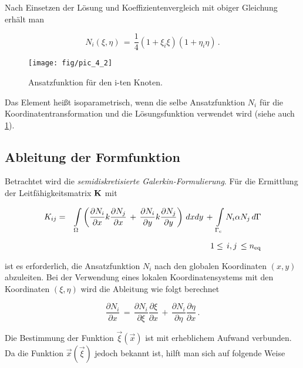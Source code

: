 Nach Einsetzen der Lösung und Koeffizientenvergleich mit obiger Gleichung
erhält man

\begin{equation}
N_i(\xi,\eta)\,=\,\frac{1}{4}\left(1+\xi_i\xi\right)\left(1+\eta_i\eta\right)\,.
\end{equation}

\begin{figure}[htb]
\begin{center}
\texttt{[image: fig/pic\_4\_2]}
\caption{Ansatzfunktion für den i-ten Knoten.}
\label{fig:Ansatzfunktion}
\end{center}
\end{figure}

Das Element heißt isoparametrisch, wenn die selbe Ansatzfunktion $N_i$ für die
Koordinatentransformation und die Lösungsfunktion verwendet wird
(siehe auch \ref{fig:Ansatzfunktion}).

\subsection{Ableitung der Formfunktion}

Betrachtet wird die {\em semidiskretisierte Galerkin-Formulierung}.
Für die Ermittlung der Leitfähigkeitsmatrix $\bf K$ mit

\begin{eqnarray}
K_{ij} &=& \int\limits_\Omega \left(\frac{\partial N_i}{\partial x}k\frac{\partial
N_j}{\partial x}\,+\,\frac{\partial     N_i}{\partial y}k\frac{\partial
N_j}{\partial y}\right)\,dxdy\,+\,\int\limits_{\Gamma_{\rm c}}N_i\alpha N_j\,d\Gamma
\nonumber \\[2mm]
&&1 \le \,i,j\, \le n_{\rm eq}
\end{eqnarray}

ist es erforderlich, die Ansatzfunktion $N_i$ nach den globalen Koordinaten
$(x,y)$ abzuleiten.  Bei der Verwendung eines lokalen Koordinatensystems mit
den Koordinaten $(\xi,\eta)$ wird die Ableitung
wie folgt berechnet

\begin{equation}
\frac{\partial N_i}{\partial x}\,=\,\frac{\partial N_i}{\partial \xi}
\frac{\partial \xi}{\partial x}\,+\,\frac{\partial N_i}{\partial \eta}
\frac{\partial \eta}{\partial x}\,.
\end{equation}

Die Bestimmung der Funktion     $ \vec{\xi}(\vec{x}) $ ist mit
erheblichem Aufwand verbunden. Da die Funktion $ \vec{x}(\vec{\xi}) $
jedoch bekannt ist, hilft man sich auf folgende Weise

